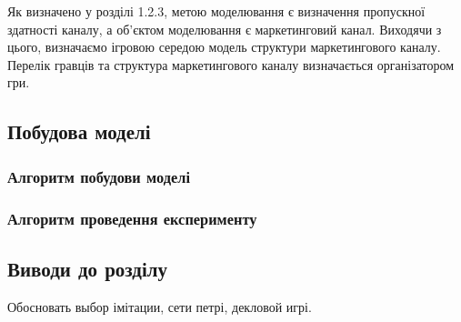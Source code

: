 Як визначено у розділі 1.2.3, метою моделювання є визначення пропускної здатності каналу, а об’єктом моделювання є маркетинговий канал. Виходячи з цього, визначаємо ігровою середою модель структури маркетингового каналу. Перелік гравців та структура маркетингового каналу визначається організатором гри.

\subsection{Побудова моделі}
\subsubsection{Алгоритм побудови моделі}
 



\subsubsection{Алгоритм проведення експерименту}
\subsection{Виводи до розділу}
Обосновать выбор імітации, сети петрі, декловой игрі.


 
